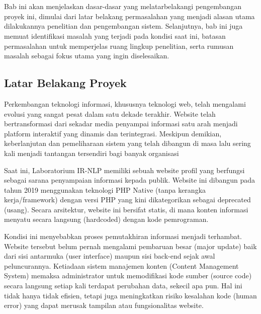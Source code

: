 \chapter{\babSatu}
Bab ini akan menjelaskan dasar-dasar yang melatarbelakangi pengembangan proyek ini, dimulai dari latar belakang permasalahan yang menjadi alasan utama dilakukannya penelitian dan pengembangan sistem. Selanjutnya, bab ini juga memuat identifikasi masalah yang terjadi pada kondisi saat ini, batasan permasalahan untuk memperjelas ruang lingkup penelitian, serta rumusan masalah sebagai fokus utama yang ingin diselesaikan.


\section{Latar Belakang Proyek}
Perkembangan teknologi informasi, khususnya teknologi web, telah mengalami evolusi yang sangat pesat dalam satu dekade terakhir. Website telah bertransformasi dari sekadar media penyampai informasi satu arah menjadi platform interaktif yang dinamis dan terintegrasi. Meskipun demikian, keberlanjutan dan pemeliharaan sistem yang telah dibangun di masa lalu sering kali menjadi tantangan tersendiri bagi banyak organisasi

Saat ini, Laboratorium IR-NLP memiliki sebuah website profil yang berfungsi sebagai sarana penyampaian informasi kepada publik. Website ini dibangun pada tahun 2019 menggunakan teknologi PHP Native (tanpa kerangka kerja/framework) dengan versi PHP yang kini dikategorikan sebagai deprecated (usang). Secara arsitektur, website ini bersifat statis, di mana konten informasi menyatu secara langsung (hardcoded) dengan kode pemrograman.

Kondisi ini menyebabkan proses pemutakhiran informasi menjadi terhambat. Website tersebut belum pernah mengalami pembaruan besar (major update) baik dari sisi antarmuka (user interface) maupun sisi back-end sejak awal peluncurannya. Ketiadaan sistem manajemen konten (Content Management System) memaksa administrator untuk memodifikasi kode sumber (source code) secara langsung setiap kali terdapat perubahan data, sekecil apa pun. Hal ini tidak hanya tidak efisien, tetapi juga meningkatkan risiko kesalahan kode (human error) yang dapat merusak tampilan atau fungsionalitas website.

